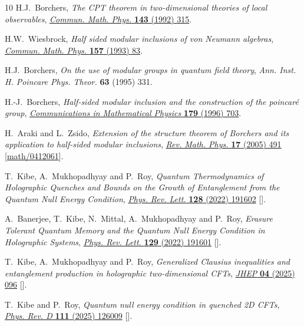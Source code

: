 \documentclass[11pt,a4paper]{article}
\theoremstyle{plain}
\numberwithin{theorem}{section}
\theoremstyle{definition}
\newcommand{\?}{\overset{?}{=}}
\begin{document}
\begin{thebibliography}{10}
H.J.~Borchers, \emph{{The CPT theorem in two-dimensional theories of local
  observables}}, \href{https://doi.org/10.1007/BF02099011}{\emph{Commun. Math.
  Phys.} {\bfseries 143} (1992) 315}.

H.W.~Wiesbrock, \emph{{Half sided modular inclusions of von Neumann algebras}},
  \href{https://doi.org/10.1007/BF02098019}{\emph{Commun. Math. Phys.}
  {\bfseries 157} (1993) 83}.

H.J.~Borchers, \emph{{On the use of modular groups in quantum field theory}},
  {\emph{Ann. Inst. H. Poincare Phys. Theor.} {\bfseries 63} (1995) 331}.

H.-J.~Borchers, \emph{Half-sided modular inclusion and the construction of the
  poincaré group},
  \href{https://doi.org/10.1007/BF02100104}{\emph{Communications in
  Mathematical Physics} {\bfseries 179} (1996) 703}.

H.~Araki and L.~Zsido, \emph{{Extension of the structure theorem of Borchers
  and its application to half-sided modular inclusions}},
  \href{https://doi.org/10.1142/S0129055X05002388}{\emph{Rev. Math. Phys.}
  {\bfseries 17} (2005) 491}
  [\href{https://arxiv.org/abs/math/0412061}{{\ttfamily math/0412061}}].

T.~Kibe, A.~Mukhopadhyay and P.~Roy, \emph{{Quantum Thermodynamics of
  Holographic Quenches and Bounds on the Growth of Entanglement from the
  Quantum Null Energy Condition}},
  \href{https://doi.org/10.1103/PhysRevLett.128.191602}{\emph{Phys. Rev. Lett.}
  {\bfseries 128} (2022) 191602}
  [\href{https://arxiv.org/abs/2109.09914}{{}}].

A.~Banerjee, T.~Kibe, N.~Mittal, A.~Mukhopadhyay and P.~Roy, \emph{{Erasure
  Tolerant Quantum Memory and the Quantum Null Energy Condition in Holographic
  Systems}}, \href{https://doi.org/10.1103/PhysRevLett.129.191601}{\emph{Phys.
  Rev. Lett.} {\bfseries 129} (2022) 191601}
  [\href{https://arxiv.org/abs/2202.00022}{{}}].

T.~Kibe, A.~Mukhopadhyay and P.~Roy, \emph{{Generalized Clausius inequalities
  and entanglement production in holographic two-dimensional CFTs}},
  \href{https://doi.org/10.1007/JHEP04(2025)096}{\emph{JHEP} {\bfseries 04}
  (2025) 096} [\href{https://arxiv.org/abs/2412.13256}{{}}].

T.~Kibe and P.~Roy, \emph{{Quantum null energy condition in quenched 2D CFTs}},
  \href{https://doi.org/10.1103/2p7v-f28f}{\emph{Phys. Rev. D} {\bfseries 111}
  (2025) 126009} [\href{https://arxiv.org/abs/2503.17448}{{}}].


\end{thebibliography}
\end{document}
